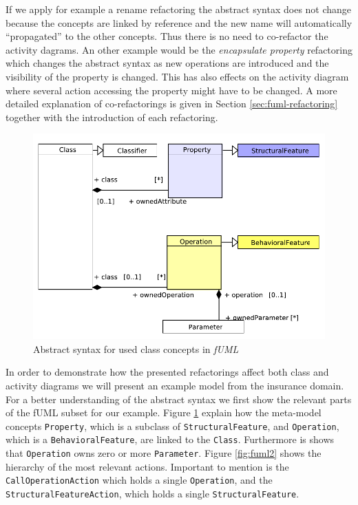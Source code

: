 \documentclass{llncs}
\begin{document}
If we apply for example a rename refactoring the abstract syntax does not change because the concepts are linked 
by reference and the new name will automatically ``propagated'' to the other concepts. Thus there is no need to 
co-refactor the activity dagrams. An other example would be the \textit{encapsulate property} refactoring which 
changes the abstract syntax as new operations are introduced and the visibility of the property is changed. This 
has also effects on the activity diagram where several action accessing the property might have to be changed. 
A more detailed explanation of
co-refactorings is given in Section \ref{sec:fuml-refactoring} together with the introduction of each refactoring.

\begin{figure}[h!t]
 \centering
 \includegraphics[scale=0.8]{images/Model_Model_Classifiers}
 \caption{Abstract syntax for used class concepts in \textit{fUML}}
 \label{fig:fuml1}
\end{figure}

In order to demonstrate how the presented refactorings affect both class and activity diagrams we will present an example 
model from the insurance domain. For a better understanding of the abstract syntax we first show the relevant parts of the fUML 
subset for our example. Figure \ref{fig:fuml1} explain how the meta-model concepts \texttt{Property}, which is a subclass of 
\texttt{Structural\-Feature}, and \texttt{Operation}, which is a \texttt{Behavioral\-Feature}, are linked to the \texttt{Class}. 
Furthermore is shows that \texttt{Operation} owns zero or more \texttt{Parameter}. Figure \ref{fig:fuml2} shows the hierarchy of 
the most relevant actions. Important to mention is the \texttt{Call\-Operation\-Action} which holds a single \texttt{Operation}, 
and the \texttt{Structural\-Feature\-Action}, which holds a single \texttt{Structural\-Feature}.
\end{document}
